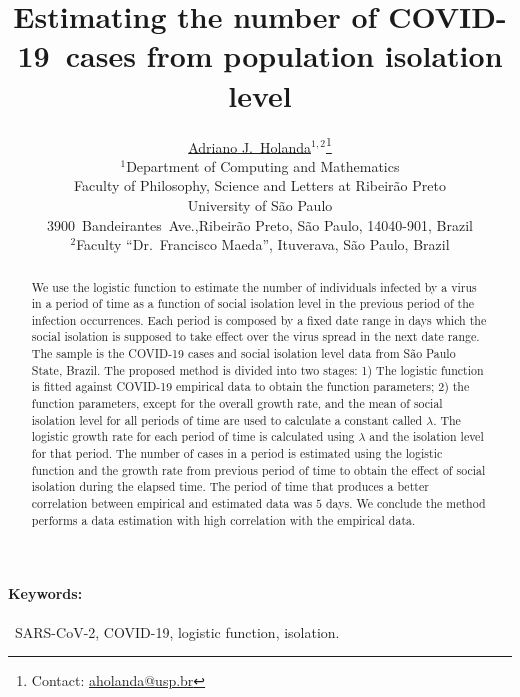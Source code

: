 \documentclass[times]{article}
\def\covid{\hbox{COVID-19}} %
\def\sarscov{{SARS-CoV-2}}
\begin{document}
\title{Estimating the number of \covid\ cases from population isolation level}
\author{\href{https://dcm.ffclrp.usp.br/~aholanda}{Adriano J.\ Holanda}$^{1,2}$\footnote{Contact: \href{mailto:aholanda@usp.br}{aholanda@usp.br}}\\
\small $^1$Department of Computing and Mathematics\\
\small Faculty of Philosophy, Science and Letters at Ribeir\~{a}o Preto \\
\small University of S\~{a}o Paulo \\
\small \hbox{3900 Bandeirantes Ave.},Ribeirão Preto, S\~{a}o Paulo, 14040-901, Brazil\\
\small $^2$Faculty ``Dr.\ Francisco Maeda'', Ituverava, S\~{a}o Paulo, Brazil}
\maketitle


\begin{abstract}
We use the logistic function to estimate the number 
of individuals infected by a virus in a period of time
as a function of social isolation level 
in the previous period of the infection occurrences.
Each period is composed by a fixed date range in days 
which the social isolation is supposed to take
effect over the virus spread in the next 
date range.
The sample is the COVID-19 cases and 
social isolation level data from S\~{a}o Paulo State, Brazil.  
The proposed method is divided into two stages: 
1) The logistic function is fitted against COVID-19 
empirical data to obtain the function parameters; 
2) the function parameters, 
 except for the overall growth rate,
 and the mean of social isolation level for all periods of time 
are used to calculate a constant called $\lambda$.
The logistic growth rate for each period of time
is calculated using $\lambda$ 
and the isolation level for that period.
 The number of cases in a period is estimated using 
the logistic function and the growth rate 
from previous period of time 
to obtain the effect of social isolation during the
elapsed time. 
The period of time that produces a 
better correlation between empirical and estimated 
data was $5$ days. 
We conclude the method performs a data estimation with  
 high correlation with the empirical data.
\end{abstract}

\paragraph{Keywords:}~\sarscov, COVID-19, logistic function, isolation.
\end{document}
